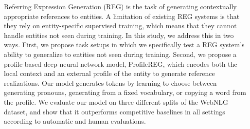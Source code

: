 Referring Expression Generation (REG) is the task of generating contextually appropriate references to entities. A limitation of existing REG systems is that they rely on entity-specific supervised training, which means that they cannot handle entities not seen during training. In this study, we address this in two ways. First, we propose task setups in which we specifically test a REG system's ability to generalize to entities not seen during training. Second, we propose a profile-based deep neural network model, ProfileREG, which encodes both the local context and an external profile of the entity to generate reference realizations. Our model generates tokens by learning to choose between generating pronouns, generating from a fixed vocabulary, or copying a word from the profile. We evaluate our model on three different splits of the WebNLG dataset, and show that it outperforms competitive baselines in all settings according to automatic and human evaluations.